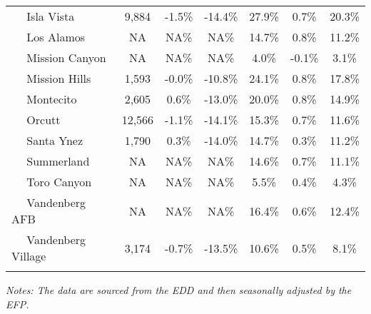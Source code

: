 \documentclass[12pt]{article}
\begin{document}
\begin{landscape}
\begin{table}
\begin{tabular}{|l|c|c|c||c|c|c|}
$\quad$ Isla Vista & 9,884 & -1.5\% & -14.4\% & 27.9\% & 0.7\% & 20.3\% \\
$\quad$ Los Alamos & NA & NA\% & NA\% & 14.7\% & 0.8\% & 11.2\% \\
$\quad$ Mission Canyon & NA & NA\% & NA\% & 4.0\% & -0.1\% & 3.1\% \\
$\quad$ Mission Hills & 1,593 & -0.0\% & -10.8\% & 24.1\% & 0.8\% & 17.8\% \\
$\quad$ Montecito & 2,605 & 0.6\% & -13.0\% & 20.0\% & 0.8\% & 14.9\% \\
$\quad$ Orcutt & 12,566 & -1.1\% & -14.1\% & 15.3\% & 0.7\% & 11.6\% \\
$\quad$ Santa Ynez & 1,790 & 0.3\% & -14.0\% & 14.7\% & 0.3\% & 11.2\% \\
$\quad$ Summerland & NA & NA\% & NA\% & 14.6\% & 0.7\% & 11.1\% \\
$\quad$ Toro Canyon & NA & NA\% & NA\% & 5.5\% & 0.4\% & 4.3\% \\
$\quad$ Vandenberg AFB & NA & NA\% & NA\% & 16.4\% & 0.6\% & 12.4\% \\
$\quad$ Vandenberg Village & 3,174 & -0.7\% & -13.5\% & 10.6\% & 0.5\% & 8.1\% \\
&&&&&& \\ \hline \hline
\end{tabular}
\par
\vspace{.5em}
\footnotesize
\textit{Notes: The data are sourced from the EDD and then seasonally adjusted by the EFP.}
\end{table}
\end{landscape}
\end{document}
